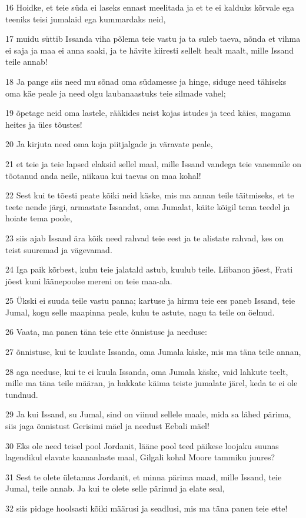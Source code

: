 \par 16 Hoidke, et teie süda ei laseks ennast meelitada ja et te ei kalduks kõrvale ega teeniks teisi jumalaid ega kummardaks neid,
\par 17 muidu süttib Issanda viha põlema teie vastu ja ta suleb taeva, nõnda et vihma ei saja ja maa ei anna saaki, ja te hävite kiiresti sellelt healt maalt, mille Issand teile annab!
\par 18 Ja pange siis need mu sõnad oma südamesse ja hinge, siduge need tähiseks oma käe peale ja need olgu laubanaastuks teie silmade vahel;
\par 19 õpetage neid oma lastele, rääkides neist kojas istudes ja teed käies, magama heites ja üles tõustes!
\par 20 Ja kirjuta need oma koja piitjalgade ja väravate peale,
\par 21 et teie ja teie lapsed elaksid sellel maal, mille Issand vandega teie vanemaile on tõotanud anda neile, niikaua kui taevas on maa kohal!
\par 22 Sest kui te tõesti peate kõiki neid käske, mis ma annan teile täitmiseks, et te teete nende järgi, armastate Issandat, oma Jumalat, käite kõigil tema teedel ja hoiate tema poole,
\par 23 siis ajab Issand ära kõik need rahvad teie eest ja te alistate rahvad, kes on teist suuremad ja vägevamad.
\par 24 Iga paik kõrbest, kuhu teie jalatald astub, kuulub teile. Liibanon jõest, Frati jõest kuni läänepoolse mereni on teie maa-ala.
\par 25 Ükski ei suuda teile vastu panna; kartuse ja hirmu teie ees paneb Issand, teie Jumal, kogu selle maapinna peale, kuhu te astute, nagu ta teile on öelnud.
\par 26 Vaata, ma panen täna teie ette õnnistuse ja needuse:
\par 27 õnnistuse, kui te kuulate Issanda, oma Jumala käske, mis ma täna teile annan,
\par 28 aga needuse, kui te ei kuula Issanda, oma Jumala käske, vaid lahkute teelt, mille ma täna teile määran, ja hakkate käima teiste jumalate järel, keda te ei ole tundnud.
\par 29 Ja kui Issand, su Jumal, sind on viinud sellele maale, mida sa lähed pärima, siis jaga õnnistust Gerisimi mäel ja needust Eebali mäel!
\par 30 Eks ole need teisel pool Jordanit, lääne pool teed päikese loojaku suunas lagendikul elavate kaananlaste maal, Gilgali kohal Moore tammiku juures?
\par 31 Sest te olete ületamas Jordanit, et minna pärima maad, mille Issand, teie Jumal, teile annab. Ja kui te olete selle pärinud ja elate seal,
\par 32 siis pidage hoolsasti kõiki määrusi ja seadlusi, mis ma täna panen teie ette!

